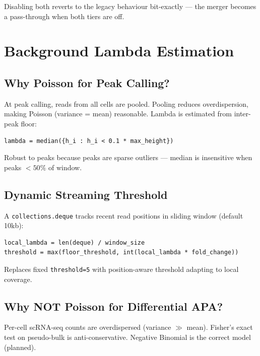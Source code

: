 \documentclass[11pt,a4paper]{article}
\begin{document}
Disabling both reverts to the legacy behaviour bit-exactly --- the merger
becomes a pass-through when both tiers are off.

\section{Background Lambda Estimation}
\label{sec:lambda}

\subsection{Why Poisson for Peak Calling?}

At peak calling, reads from all cells are pooled. Pooling reduces overdispersion,
making Poisson (variance = mean) reasonable. Lambda is estimated from inter-peak
floor:

\begin{lstlisting}
lambda = median({h_i : h_i < 0.1 * max_height})
\end{lstlisting}

Robust to peaks because peaks are sparse outliers --- median is insensitive when
peaks $< 50\%$ of window.

\subsection{Dynamic Streaming Threshold}

A \texttt{collections.deque} tracks recent read positions in sliding window
(default 10kb):

\begin{lstlisting}
local_lambda = len(deque) / window_size
threshold = max(floor_threshold, int(local_lambda * fold_change))
\end{lstlisting}

Replaces fixed \texttt{threshold=5} with position-aware threshold adapting to local
coverage.

\subsection{Why NOT Poisson for Differential APA?}

Per-cell scRNA-seq counts are overdispersed (variance $\gg$ mean). Fisher's exact
test on pseudo-bulk is anti-conservative. Negative Binomial is the correct model
(planned).
\end{document}
